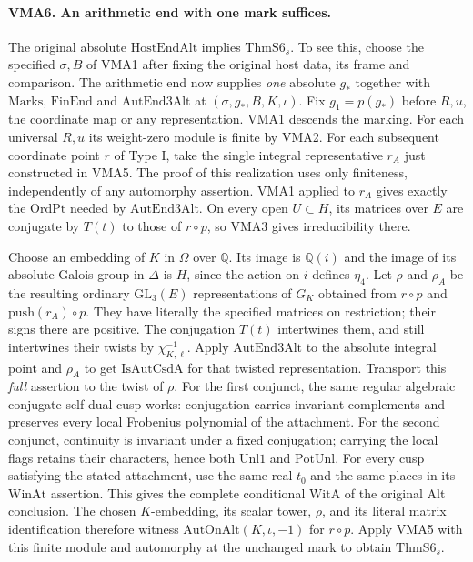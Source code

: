 \paragraph{VMA6. An arithmetic end with one mark suffices.}
\label{claim:VMA6}
The original absolute $\mathrm{HostEndAlt}$ implies
$\mathrm{ThmS6}_s$. To see this, choose the specified $\sigma,B$ of
VMA1 after fixing the original host data, its frame and comparison.
The arithmetic end now supplies \emph{one} absolute $g_*$ together
with $\mathrm{Marks}$, $\mathrm{FinEnd}$ and $\mathrm{AutEnd3Alt}$
at $(\sigma,g_*,B,K,\iota)$. Fix $g_1=p(g_*)$ before $R,u$,
the coordinate map or any representation. VMA1 descends the
marking. For each universal $R,u$ its weight-zero module is finite
by VMA2. For each subsequent coordinate point $r$ of Type I, take
the single integral representative $r_A$ just constructed in VMA5.
The proof of this realization uses only finiteness, independently
of any automorphy assertion. VMA1 applied to $r_A$ gives exactly
the $\mathrm{OrdPt}$ needed by $\mathrm{AutEnd3Alt}$. On every open
$U\subset H$, its matrices over $E$ are conjugate by $T(t)$ to
those of $r\circ p$, so VMA3 gives irreducibility there.

Choose an embedding of $K$ in $\Omega$ over $\mathbb Q$. Its
image is $\mathbb Q(i)$ and the image of its absolute Galois group
in $\Delta$ is $H$, since the action on $i$ defines $\eta_4$.
Let $\rho$ and $\rho_A$ be the resulting ordinary
$\mathrm{GL}_3(E)$ representations of $G_K$ obtained from
$r\circ p$ and $\mathrm{push}(r_A)\circ p$. They have literally
the specified matrices on restriction; their signs there are
positive. The conjugation $T(t)$ intertwines them, and still
intertwines their twists by $\chi_{K,\ell}^{-1}$.
Apply $\mathrm{AutEnd3Alt}$ to the absolute integral point and
$\rho_A$ to get $\mathrm{IsAutCsdA}$ for that twisted representation.
Transport this \emph{full} assertion to the twist of $\rho$.
For the first conjunct, the same regular algebraic
conjugate-self-dual cusp works: conjugation carries invariant
complements and preserves every local Frobenius polynomial of the
attachment. For the second conjunct, continuity is invariant under a
fixed conjugation; carrying the local flags retains their characters,
hence both $\mathrm{Unl1}$ and $\mathrm{PotUnl}$. For every cusp
satisfying the stated attachment, use the same real $t_0$ and the
same places in its $\mathrm{WinAt}$ assertion. This gives the
complete conditional $\mathrm{WitA}$ of the original Alt conclusion.
The chosen $K$-embedding, its scalar tower, $\rho$, and its literal
matrix identification therefore witness $\mathrm{AutOnAlt}(K,\iota,-1)$
for $r\circ p$. Apply VMA5 with this finite module and automorphy
at the unchanged mark to obtain $\mathrm{ThmS6}_s$.

